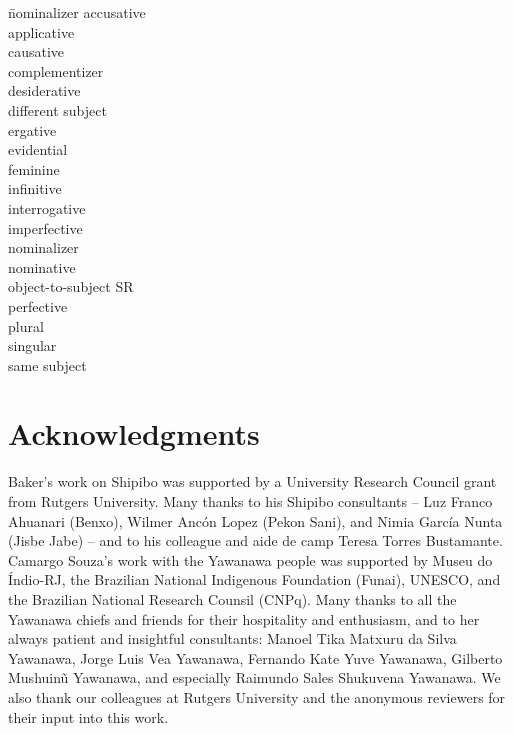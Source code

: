 \documentclass[output=paper]{langscibook}
\begin{document}
\begin{multicols}{2}
\begin{tabbing}
 \= nominalizer\kill
{}  \> accusative\\
 \> applicative\\
 \> causative\\
 \> complementizer\\
  \> desiderative\\
   \> different subject\\
  \> ergative\\
   \> evidential\\
    \> feminine\\
  \> infinitive\\
  \> interrogative\\
 \> imperfective\\
 \> nominalizer\\
  \> nominative\\
   \> object-to-subject SR\\
  \> perfective\\
   \> plural\\
   \> singular\\
   \> same subject\\    
\end{tabbing}
\end{multicols}

\section*{Acknowledgments}
Baker's work on Shipibo was supported by a University Research Council grant from Rutgers University. Many thanks to his Shipibo consultants -- Luz Franco Ahuanari (Benxo), Wilmer Ancón Lopez (Pekon Sani), and Nimia García Nunta (Jisbe Jabe) -- and to his colleague and aide de camp Teresa Torres Bustamante. Camargo Souza's work with the Yawanawa people was supported by Museu do Índio-RJ, the Brazilian National Indigenous Foundation (Funai), UNESCO, and the Brazilian National Research Counsil (CNPq). Many thanks to all the Yawanawa chiefs and friends for their hospitality and enthusiasm, and to her always patient and insightful consultants: Manoel Tika Matxuru da Silva Yawanawa, Jorge Luis Vea Yawanawa, Fernando Kate Yuve Yawanawa, Gilberto Mushuinũ Yawanawa, and especially Raimundo Sales Shukuvena Yawanawa. We also thank our colleagues at Rutgers University and the anonymous reviewers for their input into this work.

\printbibliography[heading=subbibliography,notkeyword=this]
\end{document}
